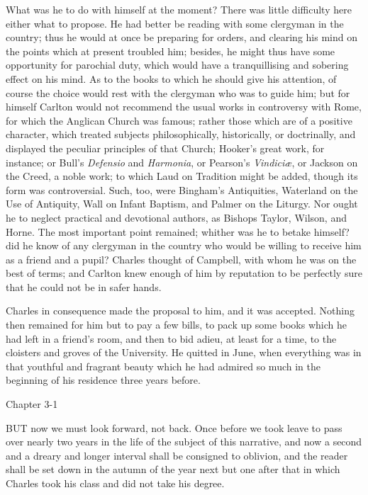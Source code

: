 What was he to do with himself at the moment? There was little
difficulty here either what to propose. He had better be reading with
some clergyman in the country; thus he would at once be preparing for
orders, and clearing his mind on the points which at present troubled
him; besides, he might thus have some opportunity for parochial duty,
which would have a tranquillising and sobering effect on his mind. As
to the books to which he should give his attention, of course the choice would rest with the clergyman who was to guide him; but for
himself Carlton would not recommend the usual works in controversy
with Rome, for which the Anglican Church was famous; rather those
which are of a positive character, which treated subjects
philosophically, historically, or doctrinally, and displayed the
peculiar principles of that Church; Hooker's great work, for instance;
or Bull's \emph{Defensio} and \emph{Harmonia}, or Pearson's \emph{Vindiciæ},
or Jackson on the Creed, a noble work; to which Laud on Tradition
might be added, though its form was controversial. Such, too, were
Bingham's Antiquities, Waterland on the Use of Antiquity, Wall on
Infant Baptism, and Palmer on the Liturgy. Nor ought he to neglect
practical and devotional authors, as Bishops Taylor, Wilson, and
Horne.
The most important point remained; whither was he to betake himself?
did he know of any clergyman in the country who would be willing to
receive him as a friend and a pupil? Charles thought of Campbell, with
whom he was on the best of terms; and Carlton knew enough of him by
reputation to be perfectly sure that he could not be in safer hands.

Charles in consequence made the proposal to him, and it was
accepted. Nothing then remained for him but to pay a few bills, to
pack up some books which he had left in a friend's room, and then to
bid adieu, at least for a time, to the cloisters and groves of the
University. He quitted in June, when everything was in that youthful
and fragrant beauty which he had admired so much in the beginning of
his residence three years before.

Chapter 3-1



BUT now we must look forward, not back.
Once before we took leave to pass over nearly two years in the life of
the subject of this narrative, and now a second and a dreary and
longer interval shall be consigned to oblivion, and the reader shall
be set down in the autumn of the year next but one after that in which
Charles took his class and did not take his degree.

